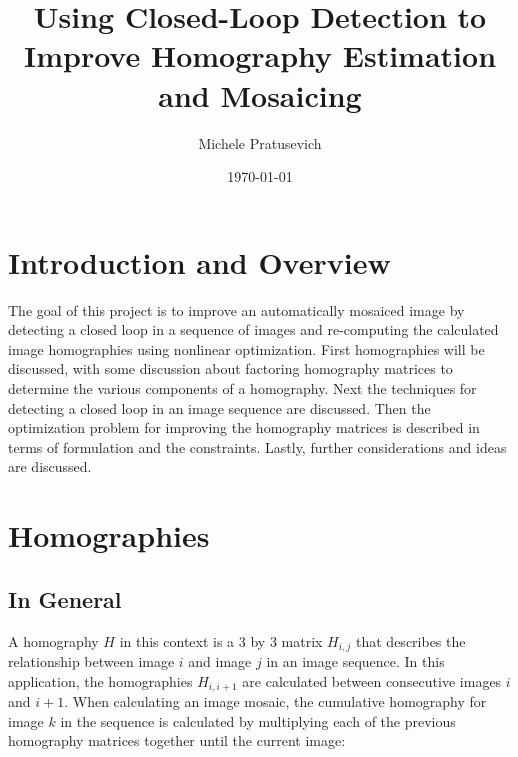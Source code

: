 \documentclass{article}
\title{Using Closed-Loop Detection to Improve Homography Estimation and Mosaicing}
\author{Michele Pratusevich}
\date{\today}
\begin{document}
 
\maketitle
\tableofcontents

%
%

\section{Introduction and Overview}

The goal of this project is to improve an automatically mosaiced image by
detecting a closed loop in a sequence of images and re-computing the calculated
image homographies using nonlinear optimization. First homographies will be
discussed, with some discussion about factoring homography matrices to
determine the various components of a homography. Next the techniques for
detecting a closed loop in an image sequence are discussed. Then the
optimization problem for improving the homography matrices is described in
terms of formulation and the constraints. Lastly, further considerations and
ideas are discussed. 

\section{Homographies}

\subsection{In General} 

A homography $H$ in this context is a $3$ by $3$ matrix $H_{i, j}$ that
describes the relationship between image $i$ and image $j$ in an image
sequence. In this application, the homographies $H_{i, i + 1}$ are calculated
between consecutive images $i$ and $i + 1$. When calculating an image mosaic,
the cumulative homography for image $k$ in the sequence is calculated by
multiplying each of the previous homography matrices together until the current
image: 
\end{document}
